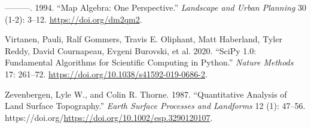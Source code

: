 \documentclass[
  letterpaper,
]{krantz}
\newlength{\cslhangindent}
\newenvironment{CSLReferences}[2] %
 {\begin{list}{}{%
  \setlength{\itemindent}{0pt}
  \setlength{\leftmargin}{0pt}
  \setlength{\parsep}{0pt}
  \ifodd #1
   \setlength{\leftmargin}{\cslhangindent}
   \setlength{\itemindent}{-1\cslhangindent}
  \fi
  \setlength{\itemsep}{#2\baselineskip}}}
 {\end{list}}
\begin{document}
\begin{CSLReferences}{1}{0}
---------. 1994. {``Map Algebra: One Perspective.''} \emph{Landscape and
Urban Planning} 30 (1-2): 3--12. \url{https://doi.org/dm2qm2}.

Virtanen, Pauli, Ralf Gommers, Travis E. Oliphant, Matt Haberland, Tyler
Reddy, David Cournapeau, Evgeni Burovski, et al. 2020. {``{{SciPy} 1.0:
Fundamental Algorithms for Scientific Computing in Python}.''}
\emph{Nature Methods} 17: 261--72.
\url{https://doi.org/10.1038/s41592-019-0686-2}.

Zevenbergen, Lyle W., and Colin R. Thorne. 1987. {``Quantitative
Analysis of Land Surface Topography.''} \emph{Earth Surface Processes
and Landforms} 12 (1): 47--56.
https://doi.org/\url{https://doi.org/10.1002/esp.3290120107}.

\end{CSLReferences}



\printindex
\end{document}
